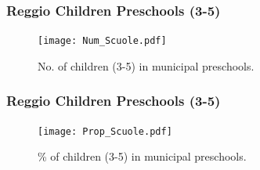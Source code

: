 \documentclass[xcolor=table]{beamer}
\begin{document}
\begin{frame}
\frametitle{Reggio Children Preschools (3-5)}
\begin{center}
\begin{figure}
\texttt{[image: Num\_Scuole.pdf]}
\caption{No. of children (3-5) in municipal preschools.}
\end{figure}
\end{center}
\end{frame} 
\begin{frame}
\frametitle{Reggio Children Preschools (3-5)}
\begin{center}
\begin{figure}
\texttt{[image: Prop\_Scuole.pdf]}
\caption{\% of children (3-5) in municipal preschools.}
\end{figure}
\end{center}
\end{frame} 
\end{document}
